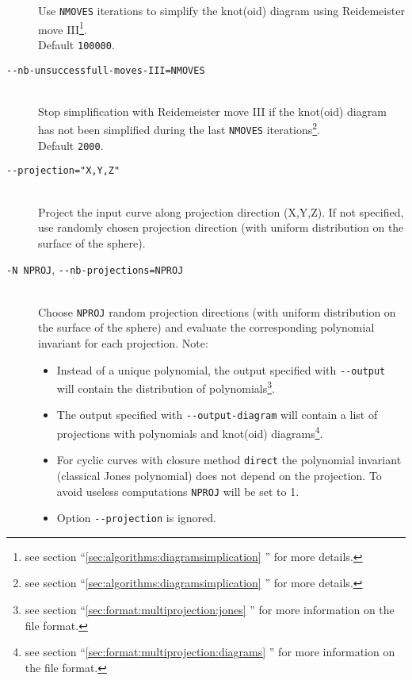 \begin{description}
  Use \lstinline{NMOVES} iterations to simplify the knot(oid) diagram using Reidemeister move III\footnote{see section  ``\ref{sec:algorithms:diagramsimplication} '' for more details.}.\\
  Default \lstinline{100000}.
\item[\lstinline{--nb-unsuccessfull-moves-III=NMOVES}]\hfill\\
  Stop simplification with Reidemeister move III if the knot(oid) diagram has not been simplified during the last \lstinline{NMOVES} iterations\footnote{see section  ``\ref{sec:algorithms:diagramsimplication} '' for more details.}.\\
  Default \lstinline{2000}.
\item[\lstinline{--projection="X,Y,Z"}]\hfill\\ Project the input curve along projection direction (X,Y,Z). If not specified, use randomly chosen projection direction (with uniform distribution on the surface of the sphere).
\item[\lstinline{-N NPROJ}, \lstinline{--nb-projections=NPROJ}]\hfill\\
  Choose \lstinline{NPROJ} random projection directions (with uniform distribution on the surface of the sphere) and evaluate the corresponding polynomial invariant for each projection. Note:
  \begin{itemize}
  \item Instead of a unique polynomial, the output specified with \lstinline{--output} will contain the distribution of polynomials\footnote{see section ``\ref{sec:format:multiprojection:jones} '' for more information on the file format.}. 
    \item The output specified with \lstinline{--output-diagram} will contain a list of projections with polynomials and knot(oid) diagrams\footnote{see section ``\ref{sec:format:multiprojection:diagrams} '' for more information on the file format.}.
    \item For cyclic curves with closure method \lstinline{direct} the polynomial invariant (classical Jones polynomial) does not depend on the projection. To avoid useless computations \lstinline{NPROJ} will be set to 1.
    \item Option \lstinline{--projection} is ignored.                                  
  \end{itemize}

\end{description}
